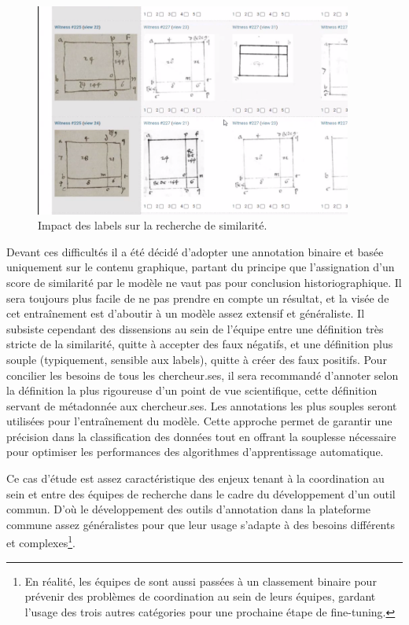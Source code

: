 \begin{figure}[H]
          \begin{center}
          \includegraphics[height=7cm]{figues/label_dissim_exemple.png}
          \end{center}
          \caption{Impact des labels sur la recherche de similarité.}
          \label{fig:simlabel} \end{figure}

Devant ces difficultés il a été décidé d'adopter une annotation binaire
et basée uniquement sur le contenu graphique, partant du principe que
l'assignation d'un score de similarité par le modèle ne vaut pas pour
conclusion historiographique. Il sera toujours plus facile de ne pas
prendre en compte un résultat, et la visée de cet entraînement est
d'aboutir à un modèle assez extensif et généraliste. Il subsiste
cependant des dissensions au sein de l'équipe entre une définition très
stricte de la similarité, quitte à accepter des faux négatifs, et une
définition plus souple (typiquement, sensible aux labels), quitte à
créer des faux positifs. Pour concilier les besoins de tous les
chercheur.ses, il sera recommandé d'annoter selon la définition la plus
rigoureuse d'un point de vue scientifique, cette définition servant de
métadonnée aux chercheur.ses. Les annotations les plus souples seront
utilisées pour l'entraînement du modèle. Cette approche permet de
garantir une précision dans la classification des données tout en
offrant la souplesse nécessaire pour optimiser les performances des
algorithmes d'apprentissage automatique.

Ce cas d'étude est assez caractéristique des enjeux tenant à la
coordination au sein et entre des équipes de recherche dans le cadre du
développement d'un outil commun. D'où le développement des outils
d'annotation dans la plateforme commune assez généralistes pour que leur
usage s'adapte à des besoins différents et complexes\footnote{En
  réalité, les équipes de \vhs sont aussi passées à un classement binaire
  pour prévenir des problèmes de coordination au sein de leurs équipes,
  gardant l'usage des trois autres catégories pour une prochaine étape
  de fine-tuning.}.

